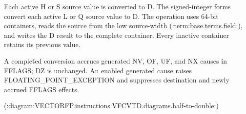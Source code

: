 Each active H or S source value is converted to D. The signed-integer forms
convert each active L or Q source value to D. The operation uses 64-bit
containers, reads the source from the low source-width (:term:base.terms.field:), and writes the D
result to the complete container. Every inactive container retains its
previous value.

A completed conversion accrues generated NV, OF, UF, and NX causes in FFLAGS;
DZ is unchanged. An enabled generated cause raises FLOATING\_POINT\_EXCEPTION and
suppresses destination and newly accrued FFLAGS effects.

(:diagram:VECTORFP.instructions.VFCVTD.diagrams.half-to-double:)
